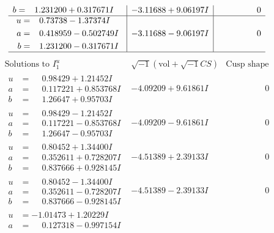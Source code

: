 \documentclass[1p]{elsarticle_modified}
\theoremstyle{definition}
\newcommand{\I}{\sqrt{-1}}
\begin{document}
$$\begin{array}{c|c|c}
\begin{aligned}
b &= \phantom{-}1.231200 + 0.317671 I\end{aligned}
 & -3.11688 + 9.06197 I & \phantom{-0.000000 } 0 \\ \hline\begin{aligned}
u &= \phantom{-}0.73738 - 1.37374 I \\
a &= \phantom{-}0.418959 - 0.502749 I \\
b &= \phantom{-}1.231200 - 0.317671 I\end{aligned}
 & -3.11688 - 9.06197 I & \phantom{-0.000000 } 0\\
 \hline 
 \end{array}$$\newpage$$\begin{array}{c|c|c}  
\text{Solutions to }I^u_{1}& \I (\text{vol} + \sqrt{-1}CS) & \text{Cusp shape}\\
 \hline 
\begin{aligned}
u &= \phantom{-}0.98429 + 1.21452 I \\
a &= \phantom{-}0.117221 + 0.853768 I \\
b &= \phantom{-}1.26647 + 0.95703 I\end{aligned}
 & -4.09209 + 9.61861 I & \phantom{-0.000000 } 0 \\ \hline\begin{aligned}
u &= \phantom{-}0.98429 - 1.21452 I \\
a &= \phantom{-}0.117221 - 0.853768 I \\
b &= \phantom{-}1.26647 - 0.95703 I\end{aligned}
 & -4.09209 - 9.61861 I & \phantom{-0.000000 } 0 \\ \hline\begin{aligned}
u &= \phantom{-}0.80452 + 1.34400 I \\
a &= \phantom{-}0.352611 + 0.728207 I \\
b &= \phantom{-}0.837666 + 0.928145 I\end{aligned}
 & -4.51389 + 2.39133 I & \phantom{-0.000000 } 0 \\ \hline\begin{aligned}
u &= \phantom{-}0.80452 - 1.34400 I \\
a &= \phantom{-}0.352611 - 0.728207 I \\
b &= \phantom{-}0.837666 - 0.928145 I\end{aligned}
 & -4.51389 - 2.39133 I & \phantom{-0.000000 } 0 \\ \hline\begin{aligned}
u &= -1.01473 + 1.20229 I \\
a &= \phantom{-}0.127318 - 0.997154 I \\

\end{aligned}
\end{array}$$
\end{document}

